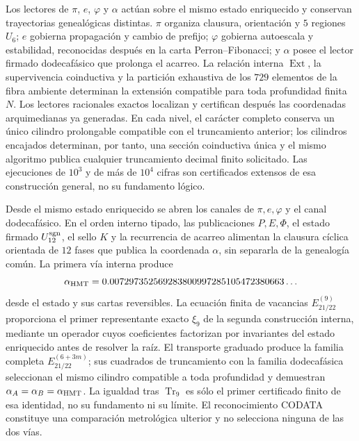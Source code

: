 Los lectores de \(\pi\), \(e\), \(\varphi\) y \(\alpha\) actúan sobre el mismo
estado enriquecido y conservan trayectorias genealógicas distintas.
\(\pi\) organiza clausura, orientación y \(5\) regiones \(U_6\); \(e\)
gobierna propagación y cambio de prefijo; \(\varphi\) gobierna autoescala y
estabilidad, reconocidas después en la carta Perron--Fibonacci; y \(\alpha\)
posee el lector firmado dodecafásico que prolonga el acarreo. La relación
interna \(\operatorname{Ext}\), la supervivencia coinductiva y la partición
exhaustiva de los \(729\) elementos de la fibra ambiente determinan la
extensión compatible para toda profundidad finita \(N\). Los lectores
racionales exactos localizan y certifican después las coordenadas
arquimedianas ya generadas. En cada nivel, el carácter completo conserva un
único cilindro prolongable compatible con el truncamiento anterior; los
cilindros encajados determinan, por tanto, una sección
coinductiva única y el mismo algoritmo publica cualquier truncamiento decimal
finito solicitado. Las ejecuciones de \(10^3\) y de más de \(10^4\) cifras son
certificados extensos de esa construcción general, no su fundamento lógico.

Desde el mismo estado enriquecido se abren los canales de
\(\pi,e,\varphi\) y el canal dodecafásico. En el orden interno tipado, las
publicaciones \(P,E,\Phi\), el estado firmado \(U_{12}^{\rm sgn}\), el sello
\(K\) y la recurrencia de acarreo alimentan la clausura cíclica orientada de
\(12\) fases que publica la coordenada \(\alpha\), sin separarla de la
genealogía común. La primera vía interna produce
\[
 \alpha_{\rm HMT}
 =0.007297352569283800997285105472380663\ldots
\]
desde el estado y sus cartas reversibles. La ecuación finita de vacancias
\(E_{21/22}^{(9)}\) proporciona el primer representante exacto \(\xi_9\) de
la segunda construcción interna, mediante un operador cuyos coeficientes
factorizan por invariantes del estado enriquecido antes de resolver la raíz.
El transporte graduado produce la familia completa
\(E_{21/22}^{(6+3m)}\); sus cuadrados de truncamiento con la familia
dodecafásica seleccionan el mismo cilindro compatible a toda profundidad y
demuestran \(\alpha_A=\alpha_B=\alpha_{\rm HMT}\). La igualdad tras
\(\operatorname{Tr}_9\) es sólo el primer certificado finito de esa identidad,
no su fundamento ni su límite. El reconocimiento CODATA constituye una
comparación metrológica ulterior y no selecciona ninguna de las dos vías.


